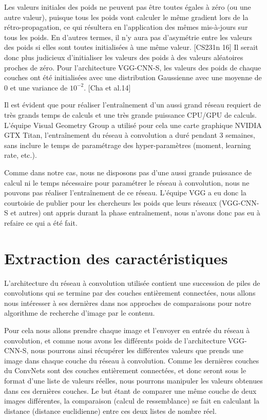 	Les valeurs initiales des poids ne peuvent pas être toutes égales à zéro (ou une autre valeur), puisque tous les poids vont calculer le même gradient lors de la rétro-propagation, ce qui résultera en l'application des mêmes mis-à-jours sur tous les poids. En d'autres termes, il n'y aura pas d’asymétrie entre les valeurs des poids si elles sont toutes initialisées à une même valeur. [CS231n 16]	
	Il serait donc plus judicieux d'initialiser les valeurs des poids à des valeurs aléatoires proches de zéro. Pour l'architecture VGG-CNN-S, les valeurs des poids de chaque couches ont été initialisées avec une distribution Gaussienne avec une moyenne de 0 et une variance de $10^{-2}$. [Cha et al.14]
	
	Il est évident que pour réaliser l’entraînement d'un aussi grand réseau requiert de très grands temps de calculs et une très grande puissance CPU/GPU de calculs. L'équipe Visual Geometry Group a utilisé pour cela une carte graphique NVIDIA GTX Titan, l'entraînement du réseau à convolution a duré pendant 3 semaines, sans inclure le temps de paramétrage des hyper-paramètres (moment, learning rate, etc.).
	
	Comme dans notre cas, nous ne disposons pas d'une aussi grande puissance de calcul ni le temps nécessaire pour paramétrer le réseau à convolution, nous ne pouvons pas réaliser l’entraînement de ce réseau. L'équipe VGG a eu donc la courtoisie de publier pour les chercheurs les poids que leurs réseaux (VGG-CNN-S et autres) ont appris durant la phase entraînement, nous n'avons donc pas eu à refaire ce qui a été fait.


\section{Extraction des caractéristiques}
	L'architecture du réseau à convolution utilisée contient une succession de piles de convolutions qui se termine par des couches entièrement connectées, nous allons nous intéresser à ses dernières dans nos approches de comparaisons pour notre algorithme de recherche d'image par le contenu.

	Pour cela nous allons prendre chaque image et l'envoyer en entrée du réseau à convolution, et comme nous avons les différents poids de l'architecture VGG-CNN-S, nous pourrons ainsi récupérer les différentes valeurs que prends une image dans chaque couche du réseau à convolution. Comme les dernières couches du ConvNets sont des couches entièrement connectées, et donc seront sous le format d'une liste de valeurs réelles, nous pourrons manipuler les valeurs obtenues dans ces dernières couches. Le but étant de comparer une même couche de deux images différentes, la comparaison (calcul de ressemblance) se fait en calculant la distance (distance euclidienne) entre ces deux listes de nombre réel.
	
